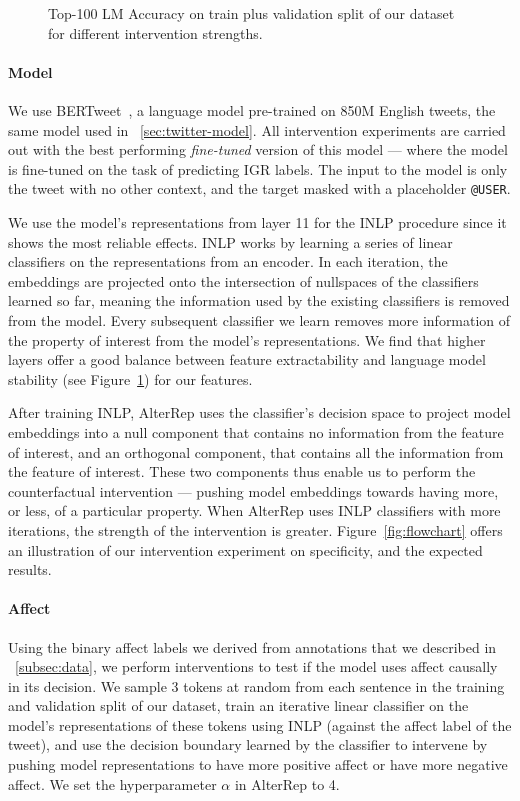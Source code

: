 \begin{figure}[t]
    \centering
    
    \caption{Top-100 LM Accuracy on train plus validation split of our dataset for different intervention strengths.}
    \label{fig:lm-acc}
\end{figure}

\paragraph{Model} We use BERTweet~\citep{nguyen_bertweet_2020}, a language model pre-trained on 850M English tweets, the same model used in \textsection~\ref{sec:twitter-model}. All intervention experiments are carried out with the best performing \emph{fine-tuned} version of this model --- where the model is fine-tuned on the task of predicting IGR labels. The input to the model is only the tweet with no other context, and the target masked with a placeholder \texttt{@USER}.

We use the model's representations from layer 11 for the INLP procedure since it shows the most reliable effects. INLP \citep{ravfogel-etal-2020-null} works by learning a series of linear classifiers on the representations from an encoder. In each iteration, the embeddings are projected onto the intersection of nullspaces of the classifiers learned so far, meaning the information used by the existing classifiers is removed from the model. Every subsequent classifier we learn removes more information of the property of interest from the model's representations.  We find that higher layers offer a good balance between feature extractability and language model stability (see Figure~\ref{fig:lm-acc}) for our features. 

After training INLP, AlterRep uses the classifier's decision space to project model embeddings into a null component that contains no information from the feature of interest, and an orthogonal component, that contains all the information from the feature of interest. These two components thus enable us to perform the counterfactual intervention --- pushing model embeddings towards having more, or less, of a particular property. When AlterRep uses INLP classifiers with more iterations, the strength of the intervention is greater. Figure~\ref{fig:flowchart} offers an illustration of our intervention experiment on specificity, and the expected results.

\paragraph{Affect} Using the binary affect labels we derived from annotations that we described in \textsection~\ref{subsec:data}, we perform interventions to test if the model uses affect causally in its decision. We sample 3 tokens at random from each sentence in the training and validation split of our dataset, train an iterative linear classifier on the model's representations of these tokens using INLP (against the affect label of the tweet), and use the decision boundary learned by the classifier to intervene by pushing model representations to have more positive affect or have more negative affect. We set the hyperparameter $\alpha$ in AlterRep to 4.


